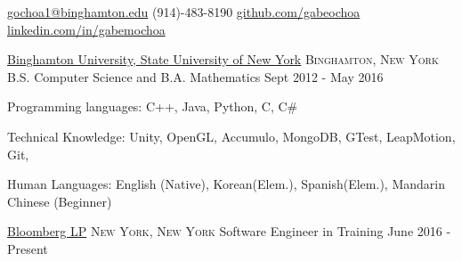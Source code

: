 \documentclass[11pt]{article}
\begin{document}


\nobreakvspace{0.3em}  %

\href{mailto:gochoa1@binghamton.edu}{gochoa1@binghamton.edu}\sbull
(914)-483-8190\sbull
\href{https://github.com/gabeochoa}{github.com/gabeochoa}\sbull
\href{https://www.linkedin.com/in/gabemochoa}{linkedin.com/in/gabemochoa}


\spacedhrule{0.1em}{0.5em}  %

\headedsection
{\href{http://www.binghamton.edu/index.php}{Binghamton University, State University of New York}}
{\textsc{Binghamton, New York}} {
    \inlineheadrightdate
    {B.S. Computer Science and B.A. Mathematics}
    {Sept 2012 - May 2016}
}


\spacedhrule{0.1em}{0.5em}  %

\inlineheadsection  %
{Programming languages:}
{ C++, Java,  Python, C, C\# }

\inlineheadsection
{Technical Knowledge:}
{ Unity, OpenGL, Accumulo, MongoDB, GTest, LeapMotion, Git, \latex }

\inlineheadsection
{Human Languages:}
{English (Native), Korean(Elem.), Spanish(Elem.), Mandarin Chinese (Beginner)}


\spacedhrule{0.1em}{0.5em}  %

\headedsection  %
{\href{http://www.bloomberg.com/}{Bloomberg LP}}
{\textsc{New York, New York}} {
    \inlineheadrightdate
    {Software Engineer in Training}
    {June 2016 - Present}
    {
    }
}
\end{document}
